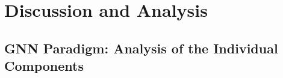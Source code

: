 \documentclass{article}
\begin{document}






\section{Discussion and Analysis}


\subsection{GNN Paradigm: Analysis of the Individual Components}
\end{document}
